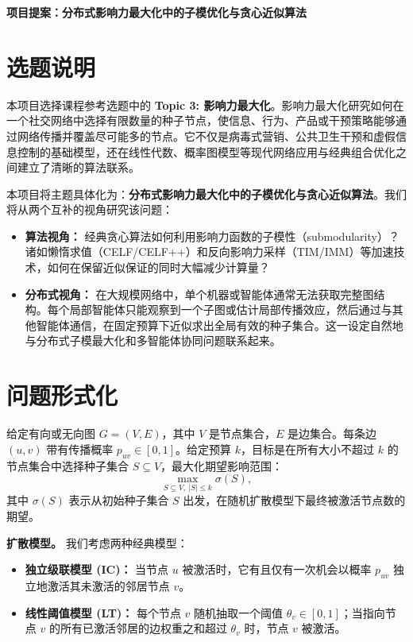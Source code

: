 \documentclass[UTF8, 10pt]{ctexart}
\begin{document}
\vspace*{-4em}
\begin{center}
{\Large \textbf{项目提案：分布式影响力最大化中的子模优化与贪心近似算法}}
\end{center}
\vspace*{-1em}

\section{选题说明}

本项目选择课程参考选题中的 \textbf{Topic 3: 影响力最大化}。影响力最大化研究如何在一个社交网络中选择有限数量的种子节点，使信息、行为、产品或干预策略能够通过网络传播并覆盖尽可能多的节点。它不仅是病毒式营销、公共卫生干预和虚假信息控制的基础模型，还在线性代数、概率图模型等现代网络应用与经典组合优化之间建立了清晰的算法联系。

本项目将主题具体化为：\textbf{分布式影响力最大化中的子模优化与贪心近似算法}。我们将从两个互补的视角研究该问题：
\begin{itemize}
    \item \textbf{算法视角：} 经典贪心算法如何利用影响力函数的子模性（submodularity）？诸如懒惰求值（CELF/CELF++）和反向影响力采样（TIM/IMM）等加速技术，如何在保留近似保证的同时大幅减少计算量？
    \item \textbf{分布式视角：} 在大规模网络中，单个机器或智能体通常无法获取完整图结构。每个局部智能体只能观察到一个子图或估计局部传播效应，然后通过与其他智能体通信，在固定预算下近似求出全局有效的种子集合。这一设定自然地与分布式子模最大化和多智能体协同问题联系起来。
\end{itemize}

\section{问题形式化}

给定有向或无向图 $G=(V,E)$，其中 $V$ 是节点集合，$E$ 是边集合。每条边 $(u,v)$ 带有传播概率 $p_{uv} \in [0,1]$。给定预算 $k$，目标是在所有大小不超过 $k$ 的节点集合中选择种子集合 $S\subseteq V$，最大化期望影响范围：
\[
    \max_{S\subseteq V,\ |S|\leq k} \sigma(S),
\]
其中 $\sigma(S)$ 表示从初始种子集合 $S$ 出发，在随机扩散模型下最终被激活节点数的期望。

\textbf{扩散模型。}
我们考虑两种经典模型：
\begin{itemize}
    \item \textbf{独立级联模型 (IC)：} 当节点 $u$ 被激活时，它有且仅有一次机会以概率 $p_{uv}$ 独立地激活其未激活的邻居节点 $v$。
    \item \textbf{线性阈值模型 (LT)：} 每个节点 $v$ 随机抽取一个阈值 $\theta_v \in [0,1]$；当指向节点 $v$ 的所有已激活邻居的边权重之和超过 $\theta_v$ 时，节点 $v$ 被激活。
\end{itemize}
\end{document}
